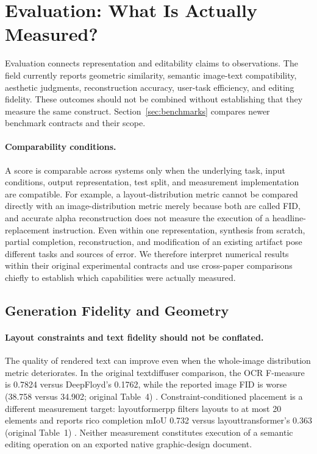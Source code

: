 \section{Evaluation: What Is Actually Measured?}
\label{sec:evaluation}
Evaluation connects representation and editability claims to observations.
The field currently reports geometric similarity, semantic image-text compatibility, aesthetic judgments, reconstruction accuracy, user-task efficiency, and editing fidelity.
These outcomes should not be combined without establishing that they measure the same construct.
Section~\ref{sec:benchmarks} compares newer benchmark contracts and their scope.



\paragraph{Comparability conditions.}
A score is comparable across systems only when the underlying task, input conditions, output representation, test split, and measurement implementation are compatible.
For example, a layout-distribution metric cannot be compared directly with an image-distribution metric merely because both are called FID, and accurate alpha reconstruction does not measure the execution of a headline-replacement instruction.
Even within one representation, synthesis from scratch, partial completion, reconstruction, and modification of an existing artifact pose different tasks and sources of error.
We therefore interpret numerical results within their original experimental contracts and use cross-paper comparisons chiefly to establish which capabilities were actually measured.

\subsection{Generation Fidelity and Geometry}
\paragraph{Layout constraints and text fidelity should not be conflated.}
The quality of rendered text can improve even when the whole-image distribution metric deteriorates.
In the original \ac{textdiffuser} comparison, the OCR F-measure is 0.7824 versus DeepFloyd's 0.1762, while the reported image FID is worse (38.758 versus 34.902; original Table~4) \citep{textdiffuser2023}.
Constraint-conditioned placement is a different measurement target: \ac{layoutformerpp} filters layouts to at most 20 elements and reports \ac{rico} completion mIoU 0.732 versus \ac{layouttransformer}'s 0.363 (original Table~1) \citep{layoutformerpp2023}.
Neither measurement constitutes execution of a semantic editing operation on an exported native graphic-design document.

